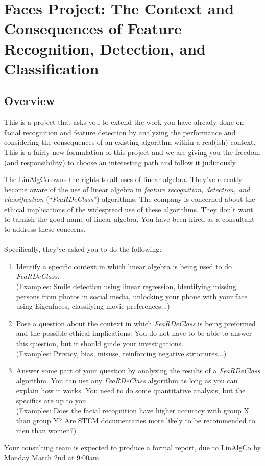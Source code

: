\chapter{Faces Project: The Context and Consequences of Feature Recognition, Detection, and Classification}
\label{ch:facesproj}

\section{Overview}

This is a project that asks you to extend the work you have already done on facial recognition and feature detection by analyzing the performance and considering the consequences of an existing algorithm within a real(ish) context.  This is a fairly new formulation of this project and we are giving you the freedom (and responsibility) to choose an interesting path and follow it judiciously. 

\begin{tcolorbox}
The LinAlgCo owns the rights to all uses of linear algebra. They've recently become aware of the use of linear algebra in \textit{feature recognition, detection, and classification} (``\textit{FeaRDeClass}'') algorithms. The company is concerned about the ethical implications of the widespread use of these algorithms. They don't want to tarnish the good name of linear algebra. You have been hired as a consultant to address these concerns.\\
\\
Specifically, they've asked you to do the following:
\begin{enumerate}
    \item Identify a specific context in which linear algebra is being used to do \textit{FeaRDeClass}.\\
    (Examples: Smile detection using linear regression, identifying missing persons from photos in social media, unlocking your phone with your face using Eigenfaces, classifying movie preferences...)
    \item Pose a question about the context in which \textit{FeaRDeClass} is being preformed and the possible ethical implications. You do not have to be able to answer this question, but it should guide your investigations.\\
    (Examples: Privacy, bias, misuse, reinforcing negative structures...)
    \item Answer some part of your question by analyzing the results of a \textit{FeaRDeClass} algorithm. You can use any \textit{FeaRDeClass} algorithm as long as you can explain how it works. You need to do some quantitative analysis, but the specifics are up to you.\\
    (Examples: Does the facial recognition have higher accuracy with group X than group Y? Are STEM documentaries more likely to be recommended to men than women?)
\end{enumerate}

Your consulting team is expected to produce a formal report, due to LinAlgCo by Monday March 2nd at 9:00am.
\end{tcolorbox}

